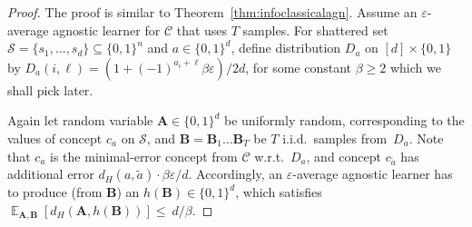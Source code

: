 \documentclass[twoside,11pt]{article}
\newcommand{\eps}{\varepsilon}
\newcommand{\Sh}{\ensuremath{\mathcal{S}}}
\DeclareMathOperator*{\Ex}{\mathbb{E}}
\def\01{\{0,1\}}
\newcommand{\C}{\ensuremath{\mathscr{C}}}
\begin{document}
\begin{proof}
	The proof is similar to Theorem~\ref{thm:infoclassicalagn}. Assume an $\eps$-average agnostic learner for $\C$ that uses $T$ samples.
	For shattered set $\Sh=\{s_1,\ldots,s_d\} \subseteq \01^n$ and $a\in\01^d$, define distribution $D_a$ on $[d]\times\01$ by $D_a(i,\ell)=(1+(-1)^{a_i+\ell}\beta\eps)/2d$, for some constant $\beta\geq 2$ which we shall pick later. 
	
	Again let random variable $\mathbf{A}\in\01^d$ be uniformly random, corresponding to the values of concept $c_a$ on $\Sh$, and $\mathbf{B}=\mathbf{B}_1\ldots\mathbf{B}_T$ be $T$ i.i.d.\ samples from~$D_a$. Note that $c_a$ is the minimal-error concept from $\C$ w.r.t.\ $D_a$, and concept $c_{\tilde{a}}$ has additional error $d_H(a,\tilde{a})\cdot \beta\eps/d$.
	Accordingly, an $\eps$-average agnostic learner has to produce (from $\mathbf{B}$) an $h(\mathbf{B})\in\01^d$, which satisfies~$\Ex_{\mathbf{A},\mathbf{B}} [d_H(\mathbf{A},h(\mathbf{B}))]\leq~d/\beta$.
	

\end{proof}
\end{document}
